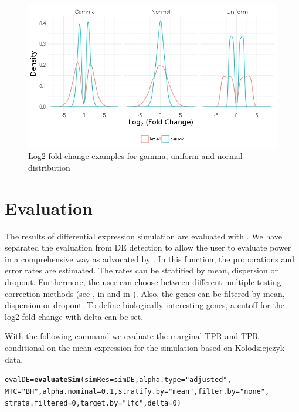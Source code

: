 \documentclass{article}\usepackage[]{graphicx}\usepackage[usenames,dvipsnames]{color}
\makeatletter
\newcommand{\hlnum}[1]{\textcolor[rgb]{0.686,0.059,0.569}{#1}}%
\newcommand{\hlstr}[1]{\textcolor[rgb]{0.192,0.494,0.8}{#1}}%
\newcommand{\hlstd}[1]{\textcolor[rgb]{0.345,0.345,0.345}{#1}}%
\newcommand{\hlkwb}[1]{\textcolor[rgb]{0.69,0.353,0.396}{#1}}%
\newcommand{\hlkwc}[1]{\textcolor[rgb]{0.333,0.667,0.333}{#1}}%
\newcommand{\hlkwd}[1]{\textcolor[rgb]{0.737,0.353,0.396}{\textbf{#1}}}%
\newenvironment{kframe}{%
 \def\at@end@of@kframe{}%
 \ifinner\ifhmode%
  \def\at@end@of@kframe{\end{minipage}}%
  \begin{minipage}{\columnwidth}%
 \fi\fi%
 \def\FrameCommand##1{\hskip\@totalleftmargin \hskip-\fboxsep
 \colorbox{shadecolor}{##1}\hskip-\fboxsep
     \hskip-\linewidth \hskip-\@totalleftmargin \hskip\columnwidth}%
 \MakeFramed {\advance\hsize-\width
   \@totalleftmargin\z@ \linewidth\hsize
   \@setminipage}}%
 {\par\unskip\endMakeFramed%
 \at@end@of@kframe}
\newenvironment{knitrout}{}{} %
\makeatother
\begin{document}
\begin{figure}[h]
\centering
\includegraphics[width=0.6\linewidth]{lfcdist.jpeg}
\caption{Log2 fold change examples for gamma, uniform and normal distribution}
\label{fig:lfcs}
\end{figure}

\section{Evaluation}

The results of differential expression simulation are evaluated with . We have separated the evaluation from DE detection to allow the user to evaluate power in a comprehensive way as advocated by \cite{Wu2015-uj}.
In this function, the proporations and error rates are estimated. The rates can be stratified by mean, dispersion or dropout. Furthermore, the user can choose between different multiple testing correction methods (see ,  in  and  in ). Also, the genes can be filtered by mean, dispersion or dropout. To define biologically interesting genes, a cutoff for the log2 fold change with delta can be set.

With the following command we evaluate the marginal TPR and TPR conditional on the mean expression for the simulation based on Kolodziejczyk data.

\begin{knitrout}
\color{fgcolor}\begin{kframe}
\begin{alltt}
\hlstd{evalDE} \hlkwb{=} \hlkwd{evaluateSim}\hlstd{(}\hlkwc{simRes} \hlstd{= simDE,} \hlkwc{alpha.type} \hlstd{=} \hlstr{"adjusted"}\hlstd{,}
    \hlkwc{MTC} \hlstd{=} \hlstr{"BH"}\hlstd{,} \hlkwc{alpha.nominal} \hlstd{=} \hlnum{0.1}\hlstd{,} \hlkwc{stratify.by} \hlstd{=} \hlstr{"mean"}\hlstd{,} \hlkwc{filter.by} \hlstd{=} \hlstr{"none"}\hlstd{,}
    \hlkwc{strata.filtered} \hlstd{=} \hlnum{0}\hlstd{,} \hlkwc{target.by} \hlstd{=} \hlstr{"lfc"}\hlstd{,} \hlkwc{delta} \hlstd{=} \hlnum{0}\hlstd{)}
\end{alltt}
\end{kframe}
\end{knitrout}
\end{document}
